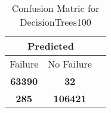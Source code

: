 \begin{table}[] 
\caption{Confusion Matric for DecisionTrees100} 
\label{Table: Prediction Accuracy-LOFDecisionTrees100100.0EKF-ignoresolarPanelDipole-solarPanelDipole} 
\centering 
\begin{tabular} 
 {@{}ccc@{}} 
\toprule 
\multicolumn{2}{c}{\textbf{Predicted}}
 \\ \midrule 
\multicolumn{1}{|c|}{Failure} & 
\multicolumn{1}{c|}{No Failure}
 \\ \midrule 
\multicolumn{1}{|c|}{\color{green}\textbf{63390}} & 
\multicolumn{1}{c|}{\color{red}\textbf{32}}
 \\ \midrule 
\multicolumn{1}{|c|}{\color{red}\textbf{285}} & 
\multicolumn{1}{c|}{\color{green}\textbf{106421}}
 \\ \bottomrule 
\end{tabular} 
\end{table} 
